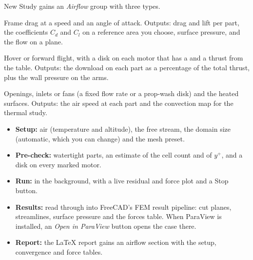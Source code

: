 New Study gains an \emph{Airflow} group with three types.
\begin{description}[nosep,font=\normalfont\bfseries]
  \item[External flow.] Frame drag at a speed and an angle of attack. Outputs: drag and lift per part, the
        coefficients $C_d$ and $C_l$ on a reference area you choose, surface pressure, and the flow on a plane.
  \item[Prop wash.] Hover or forward flight, with a disk on each motor that has a  and a
        thrust from the  table. Outputs: the download on each part as a percentage of the total
        thrust, plus the wall pressure on the arms.
  \item[Cooling.] Openings, inlets or fans (a fixed flow rate or a prop-wash disk) and the heated surfaces.
        Outputs: the air speed at each part and the convection map for the thermal study.
\end{description}
\begin{itemize}[nosep]
  \item \textbf{Setup:} air (temperature and altitude), the free stream, the domain size (automatic, which
        you can change) and the mesh preset.
  \item \textbf{Pre-check:} watertight parts, an estimate of the cell count and of $y^+$, and a disk on
        every marked motor.
  \item \textbf{Run:} in the background, with a live residual and force plot and a Stop button.
  \item \textbf{Results:} read through  into FreeCAD's FEM result pipeline: cut planes,
        streamlines, surface pressure and the forces table. When ParaView is installed, an \emph{Open in
        ParaView} button opens the case there.
  \item \textbf{Report:} the \LaTeX{} report gains an airflow section with the setup, convergence and force
        tables.
\end{itemize}


